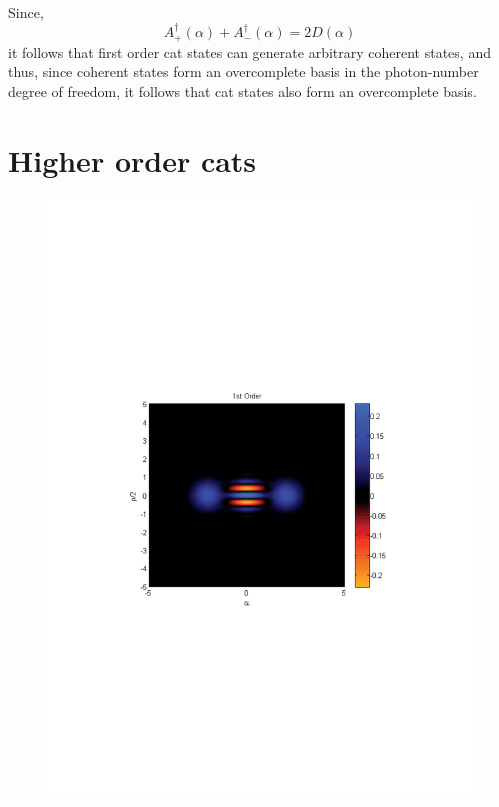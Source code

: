 \documentclass[aps,prl,twocolumn,amsmath,amssymb,nofootinbib,superscriptaddress]{revtex4}
\begin{document}
Since,
\begin{equation}
A^\dag_+(\alpha) + A^\dag_-(\alpha) = 2D(\alpha)
\end{equation}
it follows that first order cat states can generate arbitrary coherent states, and thus, since coherent states form an overcomplete basis in the photon-number degree of freedom, it follows that cat states also form an overcomplete basis.

\section{Higher order cats}

\begin{figure}[!htb]
\includegraphics[scale=0.45]{1stOrder.pdf}\\

\end{figure}
\end{document}
